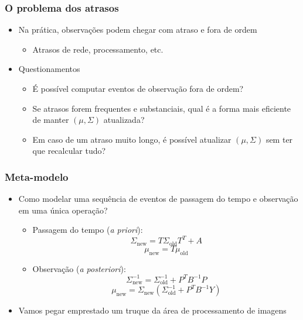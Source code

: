\documentclass{beamer}
\begin{document}
\begin{frame}\frametitle{O problema dos atrasos}
\begin{itemize}
	\item \pause  Na prática, observações podem chegar com atraso e fora de ordem
	\begin{itemize}
		\item Atrasos de rede, processamento, etc.
	\end{itemize}
	\item \pause  Questionamentos
	\begin{itemize}
		\item É possível computar eventos de observação fora de ordem?
		\item Se atrasos forem frequentes e substanciais, qual é a forma mais eficiente de manter $(\mu, \Sigma)$ atualizada?
		\item Em caso de um atraso muito longo, é possível atualizar $(\mu, \Sigma)$ sem ter que recalcular tudo? \pause
	\end{itemize}
\end{itemize}
\vfill

\text{ }\text{ }\text{ }\text{ }\text{ }\text{ }
\vfill

\end{frame}

\begin{frame}\frametitle{Meta-modelo}
\begin{itemize}
	\item Como modelar uma sequência de eventos de passagem do tempo e observação em uma única operação?
	\begin{itemize}
		\item Passagem do tempo (\textit{a priori}):
		$$\Sigma_\text{new} = T\Sigma_\text{old}T^T + A$$
		$$\mu_\text{new} = T\mu_\text{old}$$
		\item Observação (\textit{a posteriori}):
		$$\Sigma_\text{new}^{-1} = \Sigma_\text{old}^{-1} + P^TB^{-1}P$$
		$$\mu_\text{new} = \Sigma_\text{new}(\Sigma_\text{old}^{-1} + P^TB^{-1}Y)$$
	\end{itemize}
	\item \pause  Vamos pegar emprestado um truque da área de processamento de imagens
\end{itemize}
\end{frame}
\end{document}
